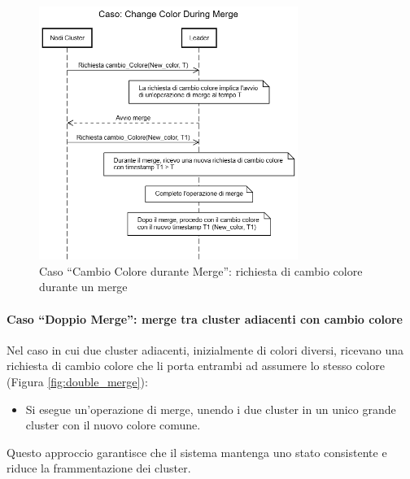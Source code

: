 \documentclass[12pt, a4paper]{report}
\begin{document}
\begin{figure}[H]
    \centering
    \includegraphics[width=0.75\textwidth,align=t]{images/concorrenza/change_color_during_merge.png}
    \caption{Caso ``Cambio Colore durante Merge'': richiesta di cambio colore durante un merge}
    \label{fig:change_color_during_merge}
\end{figure}

\newpage
\paragraph{Caso ``Doppio Merge'': merge tra cluster adiacenti con cambio colore}\label{par:double_merge}

Nel caso in cui due cluster adiacenti, inizialmente di colori diversi, ricevano una richiesta di cambio colore che li porta entrambi ad assumere lo stesso colore (Figura \ref{fig:double_merge}):

\begin{itemize}
    \item Si esegue un'operazione di merge, unendo i due cluster in un unico grande cluster con il nuovo colore comune.
\end{itemize}

Questo approccio garantisce che il sistema mantenga uno stato consistente e riduce la frammentazione dei cluster.
\end{document}
